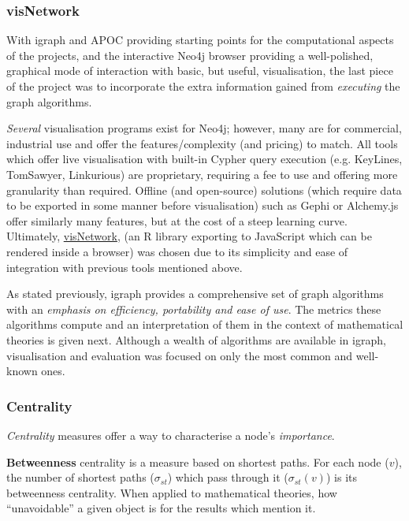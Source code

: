 \subsubsection{visNetwork}

With igraph and APOC providing starting points for the computational aspects of
the projects, and the interactive Neo4j browser providing a well-polished,
graphical mode of interaction with basic, but useful, visualisation, the last
piece of the project was to incorporate the extra information gained from
\emph{executing} the graph algorithms.

\emph{Several} visualisation programs exist for Neo4j; however, many are for
commercial, industrial use and offer the features/complexity (and pricing) to
match. All tools which offer live visualisation with built-in Cypher query
execution (e.g. KeyLines, TomSawyer, Linkurious) are proprietary, requiring a
fee to use and offering more granularity than required. Offline (and
open-source) solutions (which require data to be exported in some manner before
visualisation) such as Gephi or Alchemy.js offer similarly many features, but at
the cost of a steep learning curve.  Ultimately,
\href{http://datastorm-open.github.io/visNetwork}{visNetwork}, (an R library
exporting to JavaScript which can be rendered inside a browser) was chosen due
to its simplicity and ease of integration with previous tools mentioned above.

As stated previously, igraph provides a comprehensive set of graph algorithms
with an \emph{emphasis on efficiency, portability and ease of use}.  The
metrics these algorithms compute and an interpretation of them in the context
of mathematical theories is given next.  Although a wealth of algorithms are
available in igraph, visualisation and evaluation was focused on only the most
common and well-known ones.

\subsubsection{Centrality}

\emph{Centrality} measures offer a way to characterise a node's
\emph{importance}.

\textbf{Betweenness} centrality is a measure based on shortest paths. For each
node ($v$), the number of shortest paths ($\sigma_{st}$) which pass through it
($\sigma_{st}\left(v\right)$) is its betweenness centrality. When applied to
mathematical theories, how ``unavoidable'' a given object is for the results
which mention it.~\cite{freeman1977}

